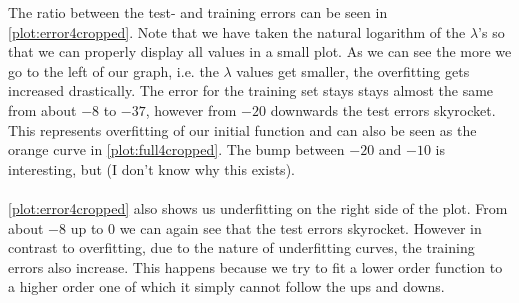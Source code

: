 \documentclass{article}
\begin{document}
	The ratio between the test- and training errors can be seen in \autoref{plot:error4cropped}. Note that we have taken the natural logarithm of the $\lambda$'s so that we can properly display all values in a small plot. As we can see the more we go to the left of our graph, i.e. the $\lambda$ values get smaller, the overfitting gets increased drastically. The error for the training set stays stays almost the same from about $-8$ to $-37$, however from $-20$ downwards the test errors skyrocket. This represents overfitting of our initial function and can also be seen as the orange curve in \autoref{plot:full4cropped}. The bump between $-20$ and $-10$ is interesting, but (I don't know why this exists). \\
	\\
	\autoref{plot:error4cropped} also shows us underfitting on the right side of the plot. From about $-8$ up to $0$ we can again see that the test errors skyrocket. However in contrast to overfitting, due to the nature of underfitting curves, the training errors also increase. This happens because we try to fit a lower order function to a higher order one of which it simply cannot follow the ups and downs. 
	
	
	
	
		
		
	
\end{document}
